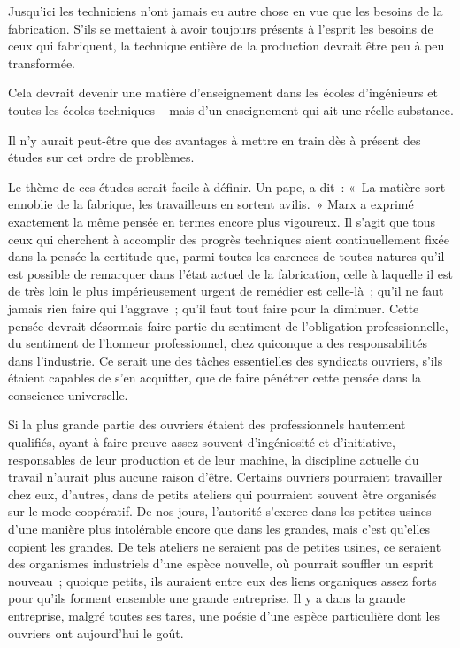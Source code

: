 \documentclass[french,twoside]{book} %
\begin{document}
Jusqu'ici les techniciens n'ont jamais eu autre chose en vue que les besoins de la fabrication. S'ils se mettaient à avoir toujours présents à l'esprit les besoins de ceux qui fabriquent, la technique entière de la production devrait être peu à peu transformée.\par
Cela devrait devenir une matière d'enseignement dans les écoles d'ingénieurs et toutes les écoles techniques – mais d'un enseignement qui ait une réelle substance.\par
Il n'y aurait peut-être que des avantages à mettre en train dès à présent des études sur cet ordre de problèmes.\par
Le thème de ces études serait facile à définir. Un pape, a dit : « La matière sort ennoblie de la fabrique, les travailleurs en sortent avilis. » Marx a exprimé exactement la même pensée en termes encore plus vigoureux. Il s'agit que tous ceux qui cherchent à accomplir des progrès techniques aient continuellement fixée dans la pensée la certitude que, parmi toutes les carences de toutes natures qu'il est possible de remarquer dans l'état actuel de la fabrication, celle à laquelle il est de très loin le plus impérieusement urgent de remédier est celle-là ; qu'il ne faut jamais rien faire qui l'aggrave ; qu'il faut tout faire pour la diminuer. Cette pensée devrait désormais faire partie du sentiment de l'obligation professionnelle, du sentiment de l'honneur professionnel, chez quiconque a des responsabilités dans l'industrie. Ce serait une des tâches essentielles des syndicats ouvriers, s'ils étaient capables de s'en acquitter, que de faire pénétrer cette pensée dans la conscience universelle.\par
Si la plus grande partie des ouvriers étaient des professionnels hautement qualifiés, ayant à faire preuve assez souvent d'ingéniosité et d'initiative, responsables de leur production et de leur machine, la discipline actuelle du travail n'aurait plus aucune raison d'être. Certains ouvriers pourraient travailler chez eux, d'autres, dans de petits ateliers qui pourraient souvent être organisés sur le mode coopératif. De nos jours, l'autorité s'exerce dans les petites usines d'une manière plus intolérable encore que dans les grandes, mais c'est qu'elles copient les grandes. De tels ateliers ne seraient pas de petites usines, ce seraient des organismes industriels d'une espèce nouvelle, où pourrait souffler un esprit nouveau ; quoique petits, ils auraient entre eux des liens organiques assez forts pour qu'ils forment ensemble une grande entreprise. Il y a dans la grande entreprise, malgré toutes ses tares, une poésie d'une espèce particulière dont les ouvriers ont aujourd'hui le goût.\par
\end{document}
